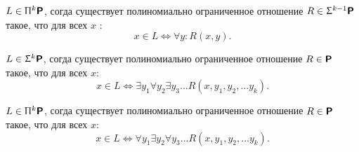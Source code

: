 \begin{thm}
	$ L \in \PI^{k}\P$, согда существует полиномиально ограниченное отношение $ R \in \SIGMA^{k-1}\P$ такое, что для всех $ x$ :
	\[
		x \in L \Longleftrightarrow \forall  y \colon R(x, y)
	.\] 
\end{thm}
\begin{cor}
    $ L \in \SIGMA^{k}\P$, согда существует полиномиально ограниченное отношение $ R \in \P$ такое, что для всех $ x$:
	\[
		x \in L \Longleftrightarrow \exists y_1 \forall y_2 \exists y_3 \ldots R(x, y_1, y_2, \ldots y_k)
	.\] 
\end{cor}
\begin{cor}
    $ L \in \PI^{k}\P$, согда существует полиномиально ограниченное отношение $ R \in \P$ такое, что для всех $ x$:
	\[
		x \in L \Longleftrightarrow \forall y_1 \exists  y_2 \forall  y_3 \ldots R(x, y_1, y_2, \ldots y_k)
	.\] 
\end{cor}

